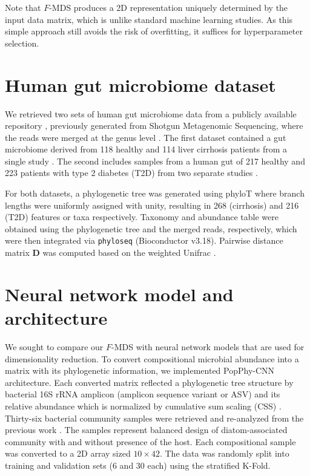 \documentclass[11pt]{article}
\newcommand{\1}{{\rm 1}\kern-0.24em{\rm I}}
\begin{document}
Note that $F$-MDS produces a 2D representation uniquely determined by the input data matrix, which is unlike standard machine learning studies. As this simple approach still avoids the risk of overfitting, it suffices for hyperparameter selection. 
\clearpage


\section{Human gut microbiome dataset}

We retrieved two sets of human gut microbiome data from a publicly available repository \cite{Pasolli16}, previously generated from Shotgun Metagenomic Sequencing, where the reads were merged at the genus level \cite{reiman20}. 
The first dataset contained a gut microbiome derived from 118 healthy and 114 liver cirrhosis patients from a single study \cite{Qin14}.
The second includes samples from a human gut of 217 healthy and 223 patients with type 2 diabetes (T2D) from two separate studies \cite{Qin12, Karlsson13}.

For both datasets, a phylogenetic tree was generated using phyloT \cite{Letunic23} where branch lengths were uniformly assigned with unity, resulting in 268 (cirrhosis) and 216 (T2D) features or taxa respectively. Taxonomy and abundance table were obtained using the phylogenetic tree and the merged reads, respectively, which were then integrated via \texttt{phyloseq} (Bioconductor v3.18). Pairwise distance matrix $\mathbf{D}$ was computed based on the weighted Unifrac \cite{lozupone07}.
\clearpage


\section{Neural network model and architecture}

We sought to compare our $F$-MDS with neural network models that are used for dimensionality reduction. To convert compositional microbial abundance into a matrix with its phylogenetic information, we implemented PopPhy-CNN \cite{reiman20} architecture. Each converted matrix reflected a phylogenetic tree structure by bacterial 16S rRNA amplicon (amplicon sequence variant or ASV) and its relative abundance which is normalized by cumulative sum scaling (CSS) \cite{paulson13}.
Thirty-six bacterial community samples were retrieved and re-analyzed from the previous work \cite{kim22}. The samples represent balanced design of diatom-associated community with and without presence of the host. Each compositional sample was converted to a 2D array sized $10 \times 42$.
The data was randomly split into training and validation sets (6 and 30 each) using the stratified K-Fold.
\end{document}
